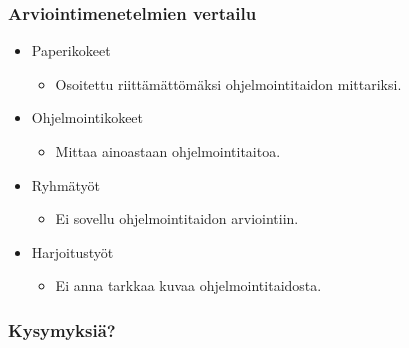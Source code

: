 \documentclass[finnish]{beamer}
\begin{document}
\frame
{
  \frametitle{Arviointimenetelmien vertailu}
  \begin{itemize}
    \item Paperikokeet
      \begin{itemize}
        \item<2-> Osoitettu riittämättömäksi ohjelmointitaidon mittariksi.
      \end{itemize}
    \item Ohjelmointikokeet
      \begin{itemize}
        \item<3-> Mittaa ainoastaan ohjelmointitaitoa.
      \end{itemize}
    \item Ryhmätyöt
      \begin{itemize}
        \item<4-> Ei sovellu ohjelmointitaidon arviointiin.
      \end{itemize}
    \item Harjoitustyöt
      \begin{itemize}
        \item<5-> Ei anna tarkkaa kuvaa ohjelmointitaidosta.
      \end{itemize}
  \end{itemize}
}

\frame
{
  \frametitle{Kysymyksiä?}
}
\end{document}
